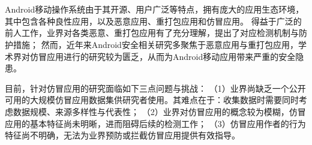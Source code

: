 \cleardoublepage{}

\chapter*{}
\vspace{-5mm}

\setlength{\baselineskip}{25pt} %

Android移动操作系统由于其开源、用户广泛等特点，拥有庞大的应用生态环境，其中包含各种良性应用，以及恶意应用、重打包应用和仿冒应用。
得益于广泛的前人工作，业界对各类恶意、重打包应用有了充分理解，提出了对应检测机制与防护措施；
然而，近年来Android安全相关研究多聚焦于恶意应用与重打包应用，学术界对仿冒应用进行的研究较为匮乏，从而为Android移动应用带来严重的安全隐患。

目前，针对仿冒应用的研究面临如下三点问题与挑战：
（1）业界尚缺乏一个公开可用的大规模仿冒应用数据集供研究者使用。其难点在于：收集数据时需要同时考虑数据规模、来源多样性与代表性；
（2）业界对仿冒应用的概念较为模糊，仿冒应用的基本特征尚未明晰，进而阻碍后续的检测工作；
（3）仿冒应用作者的行为特征尚不明确，无法为业界预防或拦截仿冒应用提供有效指导。

